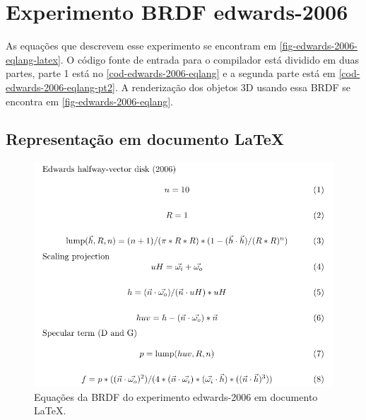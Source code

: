 \section{Experimento BRDF edwards-2006}

As equações que descrevem esse experimento se encontram em \autoref{fig-edwards-2006-eqlang-latex}. O código fonte de entrada para o compilador está dividido em duas partes, parte 1 está no \autoref{cod-edwards-2006-eqlang} e a segunda parte está em \autoref{cod-edwards-2006-eqlang-pt2}. A renderização dos objetos 3D usando essa BRDF se encontra em \autoref{fig-edwards-2006-eqlang}.

\subsection{Representação em documento \LaTeX{}}
\begin{figure}[H]
    \caption{\label{fig-edwards-2006-eqlang-latex} \small Equações da BRDF do experimento edwards-2006 em documento \LaTeX{}.}
    \begin{center}
        \includegraphics[scale=0.92]{./Imagens/brdfs/edwards-2006.pdf}
    \end{center}
\end{figure}

